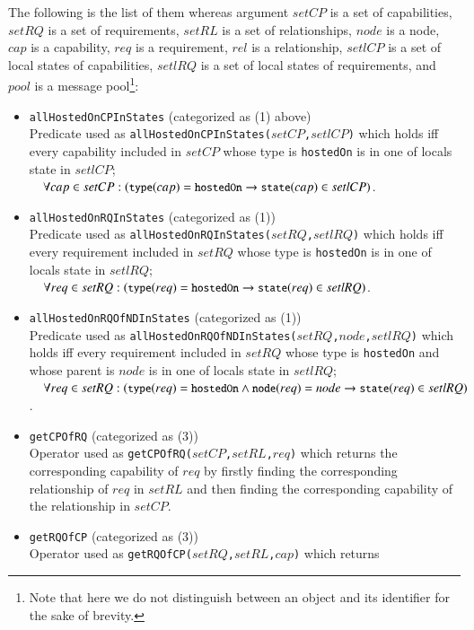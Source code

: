 \documentclass[12pt]{report}
\newcommand{\ra}{\rightarrow}
\newcommand{\mbstt}[1]{\mbox{\small{\tt {#1}}}}
\newcommand{\stt}[1]{{\small{\tt {#1}}}}
\begin{document}
The following is the list of them whereas argument $setCP$ is a set of
capabilities, $setRQ$ is a set of requirements, $setRL$ is a set of
relationships, $node$ is a node, $cap$ is a capability, $req$ is a
requirement, $rel$ is a relationship, $setlCP$ is a set of local
states of capabilities, $setlRQ$ is a set of local states of
requirements, and $pool$ is a message pool\footnote{Note that here we
  do not distinguish between an object and its identifier for the sake
  of brevity.}:
\begin{itemize}
\item \stt{allHostedOnCPInStates} (categorized as (1) above)\\ 
  Predicate used as \stt{allHostedOnCPInStates($setCP$,$setlCP$)}
  which holds iff every capability included in $setCP$ whose type is
  {\tt hostedOn} is in one of locals state in $setlCP$;\\$~~~~\forall
  cap\in
  setCP:(\mbstt{type}(cap)=\mbstt{hostedOn}\ra\mbstt{state}(cap)\in
  setlCP)$.
\item \stt{allHostedOnRQInStates} (categorized as (1))\\ 
  Predicate used as \stt{allHostedOnRQInStates($setRQ$,$setlRQ$)}
  which holds iff every requirement included in $setRQ$ whose type is
  {\tt hostedOn} is in one of locals state in $setlRQ$;\\$~~~~\forall
  req\in
  setRQ:(\mbstt{type}(req)=\mbstt{hostedOn}\ra\mbstt{state}(req)\in
  setlRQ)$.
\item \stt{allHostedOnRQOfNDInStates} (categorized as (1))\\ 
  Predicate used as
  \stt{allHostedOnRQOfNDInStates($setRQ$,$node$,$setlRQ$)} which holds iff
  every requirement included in $setRQ$ whose type is {\tt hostedOn} and whose
  parent is $node$ is in one of locals state in $setlRQ$;\\$~~~~\forall
  req\in
  setRQ:(\mbstt{type}(req)=\mbstt{hostedOn}\land\mbstt{node}(req)=node\ra\mbstt{state}(req)\in
  setlRQ)$.
\item \stt{getCPOfRQ} (categorized as (3))\\
 Operator used as \stt{getCPOfRQ($setCP$,$setRL$,$req$)} which returns
 the corresponding capability of $req$ by firstly finding the
 corresponding relationship of $req$ in $setRL$ and then finding the
 corresponding capability of the relationship in $setCP$.
\item \stt{getRQOfCP} (categorized as (3))\\
 Operator used as \stt{getRQOfCP($setRQ$,$setRL$,$cap$)} which returns

\end{itemize}
\end{document}
